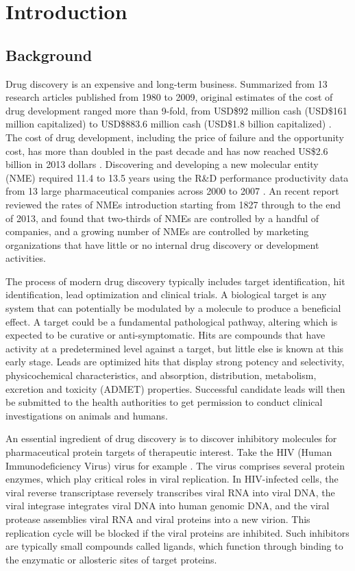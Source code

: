 \chapter{Introduction}

\section{Background}

Drug discovery is an expensive and long-term business. Summarized from 13 research articles published from 1980 to 2009, original estimates of the cost of drug development ranged more than 9-fold, from USD\$92 million cash (USD\$161 million capitalized) to USD\$883.6 million cash (USD\$1.8 billion capitalized) \citep{1431}. The cost of drug development, including the price of failure and the opportunity cost, has more than doubled in the past decade and has now reached US\$2.6 billion in 2013 dollars \citep{1611}. Discovering and developing a new molecular entity (NME) required 11.4 to 13.5 years using the R\&D performance productivity data from 13 large pharmaceutical companies across 2000 to 2007 \citep{716}. An recent report \citep{1427} reviewed the rates of NMEs introduction starting from 1827 through to the end of 2013, and found that two-thirds of NMEs are controlled by a handful of companies, and a growing number of NMEs are controlled by marketing organizations that have little or no internal drug discovery or development activities.

The process of modern drug discovery typically includes target identification, hit identification, lead optimization and clinical trials. A biological target is any system that can potentially be modulated by a molecule to produce a beneficial effect. A target could be a fundamental pathological pathway, altering which is expected to be curative or anti-symptomatic. Hits are compounds that have activity at a predetermined level against a target, but little else is known at this early stage. Leads are optimized hits that display strong potency and selectivity, physicochemical characteristics, and absorption, distribution, metabolism, excretion and toxicity (ADMET) properties. Successful candidate leads will then be submitted to the health authorities to get permission to conduct clinical investigations on animals and humans.

An essential ingredient of drug discovery is to discover inhibitory molecules for pharmaceutical protein targets of therapeutic interest. Take the HIV (Human Immunodeficiency Virus) virus for example \citep{296}. The virus comprises several protein enzymes, which play critical roles in viral replication. In HIV-infected cells, the viral reverse transcriptase reversely transcribes viral RNA into viral DNA, the viral integrase integrates viral DNA into human genomic DNA, and the viral protease assemblies viral RNA and viral proteins into a new virion. This replication cycle will be blocked if the viral proteins are inhibited. Such inhibitors are typically small compounds called ligands, which function through binding to the enzymatic or allosteric sites of target proteins.

